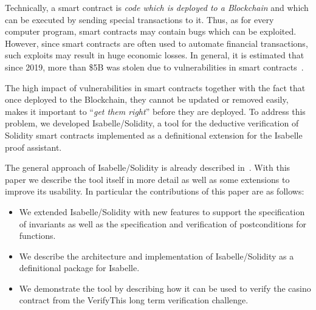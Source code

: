 \documentclass[a4paper,UKenglish,cleveref, autoref, thm-restate]{oasics-v2021}
\begin{document}
Technically, a smart contract is \emph{code which is deployed to a Blockchain} and which can be executed by sending special transactions to it.
Thus, as for every computer program, smart contracts may contain bugs which can be exploited.
However, since smart contracts are often used to automate financial transactions, such exploits may result in huge economic losses.
In general, it is estimated that since 2019, more than \$5B was stolen due to vulnerabilities in smart contracts~\cite{CipherTrace2021}.

The high impact of vulnerabilities in smart contracts together with the fact that once deployed to the Blockchain, they cannot be updated or removed easily, makes it important to ``\emph{get them right}'' before they are deployed.
To address this problem, we developed Isabelle/Solidity, a tool for the deductive verification of Solidity smart contracts implemented as a definitional extension for the Isabelle~\cite{Nipkow2002} proof assistant.

The general approach of Isabelle/Solidity is already described in~\cite{marmsoler2024secure}.
With this paper we describe the tool itself in more detail as well as some extensions to improve its usability.
In particular the contributions of this paper are as follows:
\begin{itemize}
  \item We extended Isabelle/Solidity with new features to support the specification of invariants as well as the specification and verification of postconditions for functions.
  \item We describe the architecture and implementation of Isabelle/Solidity as a definitional package for Isabelle.
  \item We demonstrate the tool by describing how it can be used to verify the casino contract from the VerifyThis long term verification challenge.
\end{itemize}
\end{document}
